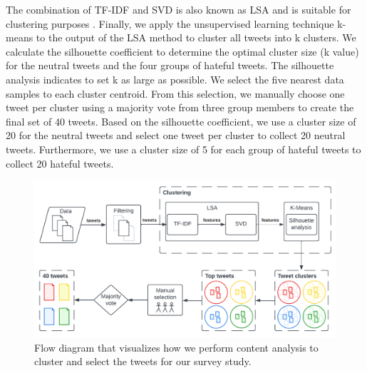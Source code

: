 %
The combination of TF-IDF and SVD is also known as LSA and is suitable for clustering purposes \citep{aggarwal2012survey}.
%
Finally, we apply the unsupervised learning technique k-means to the output of the LSA method to cluster all tweets into k clusters.
%
We calculate the silhouette coefficient to determine the optimal cluster size (k value) for the neutral tweets and the four groups of hateful tweets.
%
The silhouette analysis indicates to set k as large as possible.
%
We select the five nearest data samples to each cluster centroid.
%
From this selection, we manually choose one tweet per cluster using a majority vote from three group members to create the final set of 40 tweets.
%
Based on the silhouette coefficient, we use a cluster size of 20 for the neutral tweets and select one tweet per cluster to collect 20 neutral tweets.
%
Furthermore, we use a cluster size of 5 for each group of hateful tweets to collect 20 hateful tweets.
%
\begin{figure}
    \centering
    \includegraphics[scale=.7]{Figures/clustering.pdf}
    \caption{Flow diagram that visualizes how we perform content analysis to cluster and select the tweets for our survey study.}
    \label{fig:clustering}
\end{figure}


